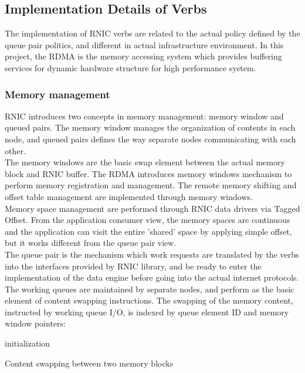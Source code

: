 \documentclass[11pt,openright,a4paper]{report}
\begin{document}
\subsection{Implementation Details of Verbs}
The implementation of RNIC verbs are related to the actual policy defined by the queue pair politics, and different in actual infrastructure environment. In this project, the RDMA is the memory accessing system which provides buffering services for dynamic hardware structure for high performance system. \\
\subsubsection{Memory management}
RNIC introduces two concepts in memory management: memory window and queued pairs. The memory window manages the organization of contents in each node, and queued pairs defines the way separate nodes communicating with each other\cite{krause2008method}.\\
The memory windows are the basic swap element between the actual memory block and RNIC buffer\cite{garcia2006binding}. The RDMA introduces memory windows mechanism to perform memory registration and management. The remote memory shifting and offset table management are implemented through memory windows. \\
Memory space management are performed through RNIC data drivers via Tagged Offset\cite{boyd2007memory}. From the application consumer view, the memory spaces are continuous and the application can visit the entire 'shared' space by applying simple offset, but it works different from the queue pair view.\\
The queue pair is the mechanism which work requests are translated by the verbs into the interfaces provided by RNIC library, and be ready to enter the implementation of the data engine before going into the actual internet protocols. The working queues are maintained by separate nodes, and perform as the basic element of content swapping instructions. The swapping of the memory content, instructed by working queue I/O, is indexed by queue element ID and memory window pointers\cite{hausauer2006rdma}:\\
\begin{algorithm}[H]
	initialization\;
\caption{Content swapping between two memory blocks}
\end{algorithm}
\end{document}
